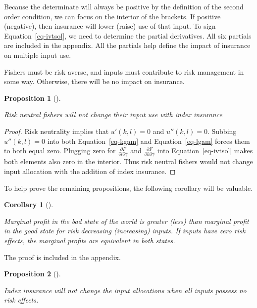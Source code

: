 \documentclass[
  letterpaper,
  DIV=11,
  numbers=noendperiod]{scrartcl}
\theoremstyle{plain}
\newtheorem{proposition}{Proposition}[section]
\theoremstyle{plain}
\newtheorem{corollary}{Corollary}[section]
\theoremstyle{remark}
\begin{document}
Because the determinate will always be positive by the definition of the
second order condition, we can focus on the interior of the brackets. If
positive (negative), then insurance will lower (raise) use of that
input. To sign Equation~\ref{eq-ivtsol}, we need to determine the
partial derivatives. All six partials are included in the appendix. All
the partials help define the impact of insurance on multiple input use.

Fishers must be risk averse, and inputs must contribute to risk
management in some way. Otherwise, there will be no impact on insurance.

\begin{proposition}[]\protect\hypertarget{prp-rn}{}\label{prp-rn}

Risk neutral fishers will not change their input use with index
insurance

\end{proposition}

\begin{proof}

Risk neutrality implies that \(u'(k,l)=0\) and \(u''(k,l)=0\). Subbing
\(u''(k,l)=0\) into both Equation~\ref{eq-kgam} and
Equation~\ref{eq-lgam} forces them to both equal zero. Plugging zero for
\(\frac{\partial F}{\partial l \partial \gamma}\) and
\(\frac{\partial F}{\partial k \partial \gamma}\) into
Equation~\ref{eq-ivtsol} makes both elements also zero in the interior.
Thus risk neutral fishers would not change input allocation with the
addition of index insurance.

\end{proof}

To help prove the remaining propositions, the following corollary will
be valuable.

\begin{corollary}[]\protect\hypertarget{cor-mp}{}\label{cor-mp}

Marginal profit in the bad state of the world is greater (less) than
marginal profit in the good state for risk decreasing (increasing)
inputs. If inputs have zero risk effects, the marginal profits are
equivalent in both states.

\end{corollary}

The proof is included in the appendix.

\begin{proposition}[]\protect\hypertarget{prp-rezero}{}\label{prp-rezero}

Index insurance will not change the input allocations when all inputs
possess no risk effects.

\end{proposition}
\end{document}
